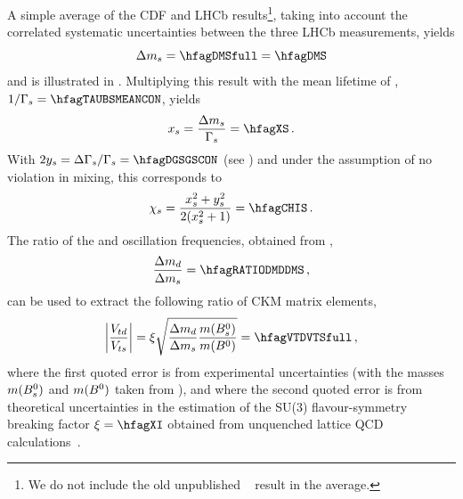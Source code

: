 A simple average of the CDF and LHCb results\footnote{
  \label{foot:life_mix:D0note5618:2008}
  We do not include the old unpublished
  \dzero~\cite{D0note5618:2008,*D0note5474:2007,*D0note5254:2006,*Abazov:2006dm_mod_cont}
  result in the average.},
taking into account the correlated systematic uncertainties between the three 
LHCb measurements, yields 
\begin{equation}
\dms = \hfagDMSfull = \hfagDMS \labe{dms}
\end{equation}
and is illustrated in .
Multiplying this result with the 
mean \Bs lifetime of , $1/\Gs=\hfagTAUBSMEANCON$,
yields
\begin{equation}
\xs = \frac{\dms}{\Gs} = \hfagXS \,. \labe{xs}
\end{equation}
With $2\ys = \DGGs=\hfagDGSGSCON$ 
(see )
and under the assumption of no \CP violation in \Bs mixing,
this corresponds to
\begin{equation}
\chis = \frac{\xs^2+\ys^2}{2(\xs^2+1)} = \hfagCHIS \,. \labe{chis}
\end{equation}
The ratio of the \Bd and \Bs oscillation frequencies, 
obtained from , 
\begin{equation}
\frac{\dmd}{\dms} = \hfagRATIODMDDMS \,, \labe{dmd_over_dms}
\end{equation}
can be used to extract the following ratio of CKM matrix elements, 
\begin{equation}
\left|\frac{V_{td}}{V_{ts}}\right| =
\xi \sqrt{\frac{\dmd}{\dms}\frac{m(\Bs)}{m(\Bd)}} = 
\hfagVTDVTSfull \,, \labe{Vtd_over_Vts}
\end{equation}
where the first quoted error is from experimental uncertainties 
(with the masses $m(B^0_s)$ and $m(B^0)$ taken from ),
and where the second quoted error is from theoretical uncertainties 
in the estimation of the SU(3) flavour-symmetry breaking factor
$\xi %
= \hfagXI$
obtained from unquenched lattice QCD calculations~\cite{Aoki:2013ldr_mod}.

 


